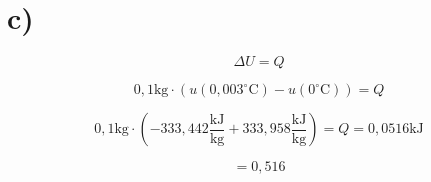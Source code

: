 

\section*{c)}

\[
\Delta U = Q
\]

\[
0{,}1 \text{kg} \cdot (u(0{,}003^\circ \text{C}) - u(0^\circ \text{C})) = Q
\]

\[
0{,}1 \text{kg} \cdot (-333{,}442 \frac{\text{kJ}}{\text{kg}} + 333{,}958 \frac{\text{kJ}}{\text{kg}}) = Q = 0{,}0516 \text{kJ}
\]

\[
= 0{,}516
\]